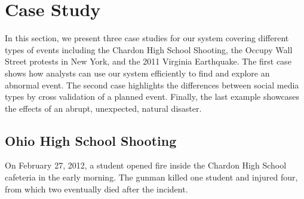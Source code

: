 \section{Case Study}
\label{sec:case_study}
In this section, we present three case studies for our system covering different types of events including the Chardon High School Shooting, 
the Occupy Wall Street protests in New York, and the 2011 Virginia Earthquake. 
The first case shows how analysts can use our system efficiently to find and explore an abnormal event.
The second case highlights the differences between social media types by cross validation of a planned event.
Finally, the last example showcases the effects of an abrupt, unexpected, natural disaster.

	

\subsection{Ohio High School Shooting}
\label{subsec:ohio_shooting}
On February 27, 2012, a student opened fire inside the Chardon High School cafeteria in the early morning.
The gunman killed one student and injured four, from which two eventually died after the incident.

